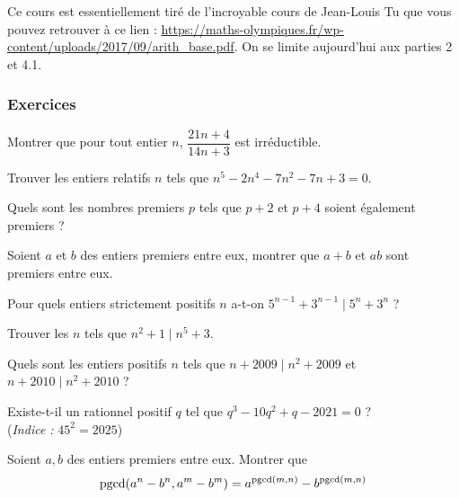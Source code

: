 Ce cours est essentiellement tiré de l'incroyable cours de Jean-Louis Tu que vous pouvez retrouver à ce lien : \url{https://maths-olympiques.fr/wp-content/uploads/2017/09/arith_base.pdf}. On se limite aujourd'hui aux parties 2 et 4.1.


\subsubsection{Exercices}


\begin{exo}
Montrer que pour tout entier $n$, $\dfrac{21n+4}{14n+3}$ est irréductible.
\end{exo}


\begin{exo}
Trouver les entiers relatifs $n$ tels que $n^5-2n^4-7n^2-7n+3=0$.
\end{exo}


\begin{exo}
Quels sont les nombres premiers $p$ tels que $p+2$ et $p+4$ soient également premiers ?
\end{exo}


\begin{exo}
Soient $a$ et $b$ des entiers premiers entre eux, montrer que $a+b$ et $ab$ sont premiers entre eux.
\end{exo}


\begin{exo}
Pour quels entiers strictement positifs $n$ a-t-on $5^{n-1}+3^{n-1}\mid 5^n+3^n$ ?
\end{exo}


\begin{exo}
Trouver les $n$ tels que $n^2+1\mid n^5+3$.
\end{exo}


\begin{exo}
Quels sont les entiers positifs $n$ tels que $n+2009\mid n^2+2009$ et $n+2010\mid n^2+2010$ ?
\end{exo}


\begin{exo}
Existe-t-il un rationnel positif $q$ tel que $q^3-10q^2+q-2021=0$ ? \\
(\emph{Indice :} $45^2=2025$)
\end{exo}


\begin{exo}
Soient $a,b$ des entiers premiers entre eux.
Montrer que
$$\operatorname{\mathrm{pgcd}}(a^n-b^n,a^m-b^m)=a^{\operatorname{\mathrm{pgcd}}(m,n)}-b^{\operatorname{\mathrm{pgcd}}(m,n)}$$
\end{exo}


